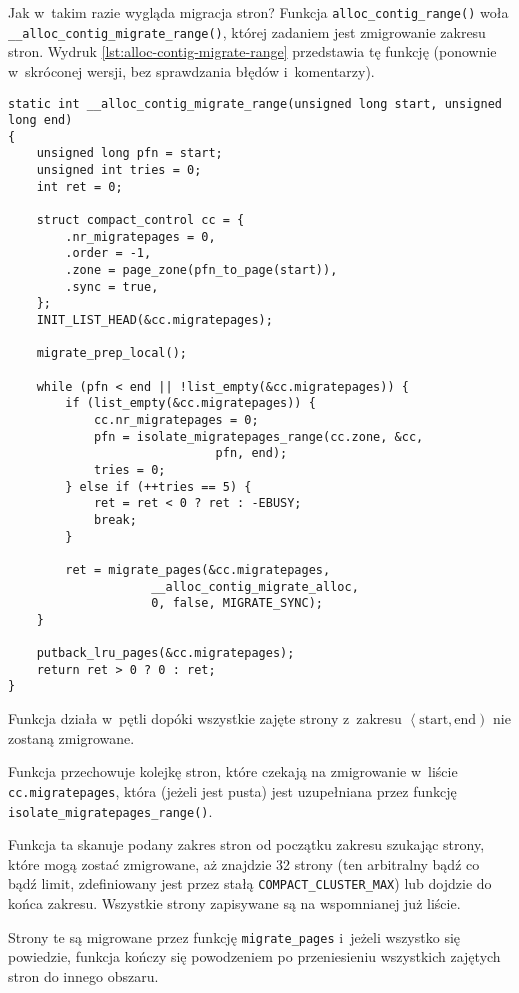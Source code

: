Jak w~takim razie wygląda migracja stron?  Funkcja
\lstinline|alloc_contig_range()| woła
\lstinline|__alloc_contig_migrate_range()|, której zadaniem jest
zmigrowanie zakresu stron.  Wydruk
\ref{lst:alloc-contig-migrate-range} przedstawia tę funkcję (ponownie
w~skróconej wersji, bez sprawdzania błędów i~komentarzy).

\begin{lstlisting}[float=tbhp,caption={Skrócony wydruk funkcji
    \lstinline|__alloc_conting_migrate_range()| z Linuksa 3.5.},label=lst:alloc-contig-migrate-range]
static int __alloc_contig_migrate_range(unsigned long start, unsigned long end)
{
	unsigned long pfn = start;
	unsigned int tries = 0;
	int ret = 0;

	struct compact_control cc = {
		.nr_migratepages = 0,
		.order = -1,
		.zone = page_zone(pfn_to_page(start)),
		.sync = true,
	};
	INIT_LIST_HEAD(&cc.migratepages);

	migrate_prep_local();

	while (pfn < end || !list_empty(&cc.migratepages)) {
		if (list_empty(&cc.migratepages)) {
			cc.nr_migratepages = 0;
			pfn = isolate_migratepages_range(cc.zone, &cc,
							 pfn, end);
			tries = 0;
		} else if (++tries == 5) {
			ret = ret < 0 ? ret : -EBUSY;
			break;
		}

		ret = migrate_pages(&cc.migratepages,
				    __alloc_contig_migrate_alloc,
				    0, false, MIGRATE_SYNC);
	}

	putback_lru_pages(&cc.migratepages);
	return ret > 0 ? 0 : ret;
}
\end{lstlisting}

Funkcja działa w~pętli dopóki wszystkie zajęte strony z~zakresu
$\left<\mathrm{start}, \mathrm{end}\right)$ nie zostaną zmigrowane.

Funkcja przechowuje kolejkę stron, które czekają na zmigrowanie
w~liście \lstinline|cc.migratepages|, która (jeżeli jest pusta) jest
uzupełniana przez funkcję \lstinline|isolate_migratepages_range()|.

Funkcja ta skanuje podany zakres stron od początku zakresu szukając
strony, które mogą zostać zmigrowane, aż znajdzie 32 strony (ten
arbitralny bądź co bądź limit, zdefiniowany jest przez stałą
\lstinline|COMPACT_CLUSTER_MAX|) lub dojdzie do końca zakresu.
Wszystkie strony zapisywane są na wspomnianej już liście.

Strony te są migrowane przez funkcję \lstinline|migrate_pages|
i~jeżeli wszystko się powiedzie, funkcja kończy się powodzeniem po
przeniesieniu wszystkich zajętych stron do innego obszaru.


